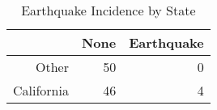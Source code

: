 \begin{table}[ht]
\centering
\begin{tabular}{rrr}
  \hline
 & None & Earthquake \\ 
  \hline
Other &  50 &   0 \\ 
  California &  46 &   4 \\ 
   \hline
\end{tabular}
\caption{Earthquake Incidence by State} 
\label{tab:earthquakes}
\end{table}
